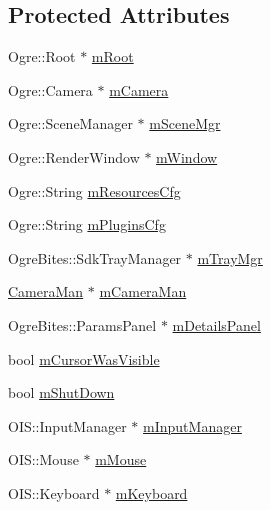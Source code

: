 \subsection*{Protected Attributes}
\begin{DoxyCompactItemize}
\item 
Ogre\-::\-Root $\ast$ \hyperlink{classBaseGame_a22226146323391088351624576b7891c}{m\-Root}
\item 
Ogre\-::\-Camera $\ast$ \hyperlink{classBaseGame_ad3c279cdf94f77cd1652ad142a498a04}{m\-Camera}
\item 
Ogre\-::\-Scene\-Manager $\ast$ \hyperlink{classBaseGame_a9ea629769242d9e7fb6f8680ba8aa9fd}{m\-Scene\-Mgr}
\item 
Ogre\-::\-Render\-Window $\ast$ \hyperlink{classBaseGame_a6ecc10c576668a3940357e8cb3b4e404}{m\-Window}
\item 
Ogre\-::\-String \hyperlink{classBaseGame_ad375b8ad206e9d7759562376c26de651}{m\-Resources\-Cfg}
\item 
Ogre\-::\-String \hyperlink{classBaseGame_a696add997f2185f90c0ed6f5dc6af20a}{m\-Plugins\-Cfg}
\item 
Ogre\-Bites\-::\-Sdk\-Tray\-Manager $\ast$ \hyperlink{classBaseGame_a7629d875df44ac5a66f408c859115801}{m\-Tray\-Mgr}
\item 
\hyperlink{classCameraMan}{Camera\-Man} $\ast$ \hyperlink{classBaseGame_a5d5ab169e4c7bd09bb624fb2875a7306}{m\-Camera\-Man}
\item 
Ogre\-Bites\-::\-Params\-Panel $\ast$ \hyperlink{classBaseGame_ac68de06a1542fc8d4c67ade85a1753c1}{m\-Details\-Panel}
\item 
bool \hyperlink{classBaseGame_a1c4ba8734fb3fee6254afc155062d59c}{m\-Cursor\-Was\-Visible}
\item 
bool \hyperlink{classBaseGame_a2eba80c12350640bc99c7e9fc0d250da}{m\-Shut\-Down}
\item 
O\-I\-S\-::\-Input\-Manager $\ast$ \hyperlink{classBaseGame_abbc23b121d9cfee4a9c9f54b560f754f}{m\-Input\-Manager}
\item 
O\-I\-S\-::\-Mouse $\ast$ \hyperlink{classBaseGame_a7534267ce3a49769c0b1aea328aabd87}{m\-Mouse}
\item 
O\-I\-S\-::\-Keyboard $\ast$ \hyperlink{classBaseGame_a95f75bc39e6e853ffe0c7e297447c8f0}{m\-Keyboard}
\end{DoxyCompactItemize}


